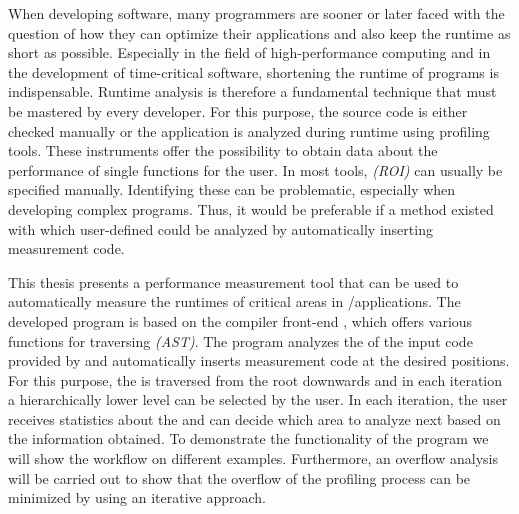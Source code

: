 \documentclass[draft,final]{vutinfth} %
\begin{document}
\begin{abstract*}
When developing software, many programmers are sooner or later faced with the question of how they can optimize their applications and also keep the runtime as short as possible. Especially in the field of high-performance computing and in the development of time-critical software, shortening the runtime of programs is indispensable. Runtime analysis is therefore a fundamental technique that must be mastered by every developer. For this purpose, the source code is either checked manually or the application is analyzed during runtime using profiling tools. These instruments offer the possibility to obtain data about the performance of single functions for the user. In most tools, \ROI\emph{(ROI)} can usually be specified manually. Identifying these can be problematic, especially when developing complex programs. Thus, it would be preferable if a method existed with which user-defined \roismall could be analyzed by automatically inserting measurement code. 

This thesis presents a performance measurement tool that can be used to automatically measure the runtimes of critical areas in \C /\CPP applications. The developed program is based on the compiler front-end \CLANG, which offers various functions for traversing \ASTSI\emph{(AST)}. The program analyzes the \astsmall of the input code provided by \CLANG and automatically inserts measurement code at the desired positions. For this purpose, the \astsmall is traversed from the root downwards and in each iteration a hierarchically lower level can be selected by the user. In each iteration, the user receives statistics about the \roismall and can decide which area to analyze next based on the information obtained. To demonstrate the functionality of the program we will show the workflow on different examples. Furthermore, an overflow analysis will be carried out to show that the overflow of the profiling process can be minimized by using an iterative approach.
\end{abstract*}


\tableofcontents* %
\cleardoublepage %

\renewcommand\lstlistlistingname{List of Listings}
\lstlistoflistings %
\cleardoublepage %
\end{document}
